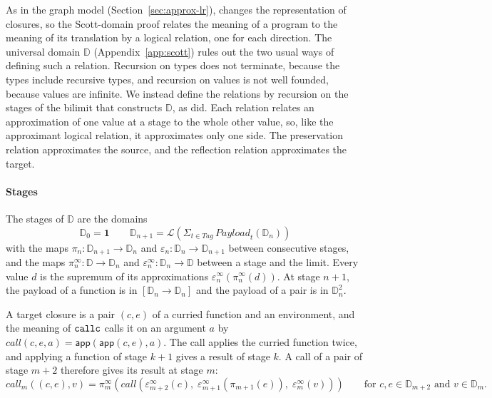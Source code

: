 As in the graph model (Section~\ref{sec:approx-lr}), 
changes the representation of closures, so the Scott-domain proof
relates the meaning of a program to the meaning of its translation by
a logical relation, one for each direction. The universal domain
$\mathbb{D}$ (Appendix~\ref{app:scott}) rules out the two usual ways
of defining such a relation. Recursion on types does not terminate,
because the types include recursive types, and recursion on values is
not well founded, because values are infinite. We instead define the
relations by recursion on the stages of the bilimit that constructs
$\mathbb{D}$, as \citet{Reynolds:1974aa} did. Each relation relates an
approximation of one value at a stage to the whole other value, so,
like the approximant logical relation, it approximates only one side.
The preservation relation approximates the source, and the reflection
relation approximates the target.

\paragraph{Stages}

The stages of $\mathbb{D}$ are the domains
\[
  \mathbb{D}_0 = \mathbf{1}
  \qquad
  \mathbb{D}_{n+1} = \mathcal{L}(\Sigma_{t \in \mathit{Tag}}\, \mathit{Payload}_t(\mathbb{D}_n))
\]
with the maps $\pi_n : \mathbb{D}_{n+1} \to \mathbb{D}_n$ and
$\varepsilon_n : \mathbb{D}_n \to \mathbb{D}_{n+1}$ between consecutive
stages, and the maps $\pi^\infty_n : \mathbb{D} \to \mathbb{D}_n$ and
$\varepsilon^\infty_n : \mathbb{D}_n \to \mathbb{D}$ between a stage and
the limit. Every value $d$ is the supremum of its approximations
$\varepsilon^\infty_n(\pi^\infty_n(d))$. At stage $n + 1$, the payload of a
function is in $[\mathbb{D}_n \to \mathbb{D}_n]$ and the payload of a
pair is in $\mathbb{D}_n^2$.

A target closure is a pair $(c, e)$ of a curried function and an
environment, and the
meaning of $\mathtt{callc}$ calls it on an argument $a$ by
$\mathit{call}(c, e, a) = \mathsf{app}(\mathsf{app}(c, e), a)$. The
call applies the curried function twice, and applying a
function of stage $k + 1$ gives a result of stage $k$. A call of a
pair of stage $m + 2$ therefore gives its result at stage $m$:
\[
  \mathit{call}_m((c, e), v) =
    \pi^\infty_m(\mathit{call}(\varepsilon^\infty_{m+2}(c),\;
      \varepsilon^\infty_{m+1}(\pi_{m+1}(e)),\;
      \varepsilon^\infty_m(v)))
  \qquad \text{for } c, e \in \mathbb{D}_{m+2} \text{ and } v \in \mathbb{D}_m.
\]

